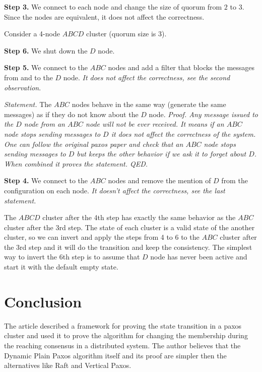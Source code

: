 \documentclass[12pt]{article}
\begin{document}
{\bf Step 3.} We connect to each node and change the size of quorum from $2$ to $3$. Since the nodes are equivalent, it does not affect the correctness.

\bigskip

Consider a 4-node $ABCD$ cluster (quorum size is 3).

\bigskip

{\bf Step 6.} We shut down the $D$ node.

\smallskip

{\bf Step 5.} We connect to the $ABC$ nodes and add a filter that blocks the messages from and to the $D$ node. \textit{It does not affect the correctness, see the second observation}.

\smallskip

\emph{Statement.} The $ABC$ nodes behave in the same way (generate the same messages) as if they do not know about the $D$ node. \textit{Proof. Any message issued to the $D$ node from an $ABC$ node will not be ever received. It means if an $ABC$ node stops sending messages to $D$ it does not affect the correctness of the system. One can follow the original paxos paper and check that an $ABC$ node stops sending messages to $D$ but keeps the other behavior if we ask it to forget about $D$. When combined it proves the statement. QED.}

\smallskip

{\bf Step 4.} We connect to the $ABC$ nodes and remove the mention of $D$ from the configuration on each node. \textit{It doesn't affect the correctness, see the last statement.}

\bigskip

The $ABCD$ cluster after the 4th step has exactly the same behavior as the $ABC$ cluster after the 3rd step. The state of each cluster is a valid state of the another cluster, so we can invert and apply the steps from 4 to 6 to the $ABC$ cluster after the 3rd step and it will do the transition and keep the consistency. The simplest way to invert the 6th step is to assume that $D$ node has never been active and start it with the default empty state.

\section{Conclusion}

The article described a framework for proving the state transition in a paxos cluster and used it to prove the algorithm for changing the membership during the reaching consensus in a distributed system. The author believes that the Dynamic Plain Paxos algorithm itself and its proof are simpler then the alternatives like Raft and Vertical Paxos.
\end{document}

